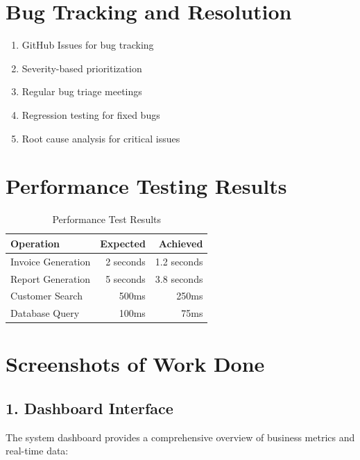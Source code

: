\documentclass[12pt,a4paper]{report}
\begin{document}
\section{Bug Tracking and Resolution}

\begin{enumerate}[label=\roman*)]
    \item GitHub Issues for bug tracking
    \item Severity-based prioritization
    \item Regular bug triage meetings
    \item Regression testing for fixed bugs
    \item Root cause analysis for critical issues
\end{enumerate}

\section{Performance Testing Results}

\begin{table}[H]
    \centering
    \begin{tabular}{|l|r|r|}
        \hline
        \textbf{Operation} & \textbf{Expected} & \textbf{Achieved} \\
        \hline
        Invoice Generation & 2 seconds & 1.2 seconds \\
        \hline
        Report Generation & 5 seconds & 3.8 seconds \\
        \hline
        Customer Search & 500ms & 250ms \\
        \hline
        Database Query & 100ms & 75ms \\
        \hline
    \end{tabular}
    \caption{Performance Test Results}
\end{table}

\newpage

\section{Screenshots of Work Done}

\subsection{1. Dashboard Interface}

The system dashboard provides a comprehensive overview of business metrics and real-time data:
\end{document}
